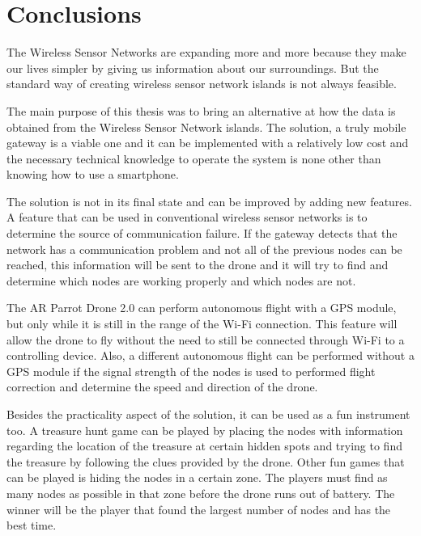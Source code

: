 \chapter{Conclusions}


The Wireless Sensor Networks are expanding more and more because they make our lives simpler by giving us information about our surroundings. But the standard way of creating wireless sensor network islands is not always feasible.

The main purpose of this thesis was to bring an alternative at how the data is obtained from the Wireless Sensor Network islands. The solution, a truly mobile gateway is a viable one and it can be implemented with a relatively low cost and the necessary technical knowledge to operate the system is none other than knowing how to use a smartphone.

The solution is not in its final state and can be improved by adding new features. A feature that can be used in conventional wireless sensor networks is to determine the source of communication failure. If the gateway detects that the network has a communication problem and not all of the previous nodes can be reached, this information will be sent to the drone and it will try to find and determine which nodes are working properly and which nodes are not.
 
The AR Parrot Drone 2.0 can perform autonomous flight with a GPS module, but only while it is still in the range of the Wi-Fi connection. This feature will allow the drone to fly without the need to still be connected through Wi-Fi to a controlling device. Also, a different autonomous flight can be performed without a GPS module if the signal strength of the nodes is used to performed flight correction and determine the speed and direction of the drone.


Besides the practicality aspect of the solution, it can be used as a fun instrument too. A treasure hunt game can be played by placing the nodes with information regarding the location of the treasure at certain hidden spots and trying to find the treasure by following the clues provided by the drone. Other fun games that can be played is hiding the nodes in a certain zone. The players must find as many nodes as possible in that zone before the drone runs out of battery. The winner will be the player that found the largest number of nodes and has the best time.
